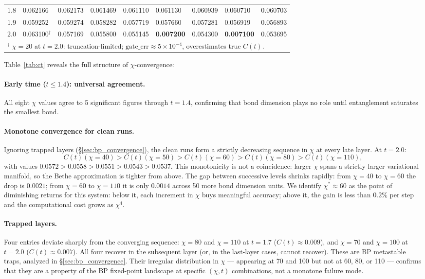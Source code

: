 \documentclass[11pt]{article}
\newcommand{\Ct}{C(t)}
\begin{document}
\begin{table}[ht]
\begin{tabular}{r llllllll}
1.8 & 0.062166 & 0.062173 & 0.061469 & 0.061110 & 0.061130 & 0.060939 & 0.060710 & 0.060703 \\
1.9 & 0.059252 & 0.059274 & 0.058282 & 0.057719 & 0.057660 & 0.057281 & 0.056919 & 0.056893 \\
2.0 & 0.063100$^\dagger$ & 0.057169 & 0.055800 & 0.055145 & \textbf{0.007200} & 0.054300 & \textbf{0.007100} & 0.053695 \\
\midrule
\multicolumn{9}{l}{%
  $^\dagger$ $\chi=20$ at $t=2.0$: truncation-limited; $\mathrm{gate\_err} \approx 5\times10^{-4}$,
  overestimates true $\Ct$.}\\
\bottomrule
\end{tabular}
\end{table}

Table~\ref{tab:ct} reveals the full structure of $\chi$-convergence:

\paragraph{Early time ($t \leq 1.4$): universal agreement.}
All eight $\chi$ values agree to 5 significant figures through $t = 1.4$,
confirming that bond dimension plays no role until entanglement saturates the
smallest bond.

\paragraph{Monotone convergence for clean runs.}
Ignoring trapped layers (§\ref{sec:bp_convergence}), the clean runs form a
strictly decreasing sequence in $\chi$ at every late layer.
At $t=2.0$:
\begin{equation}
  \Ct(\chi=40) > \Ct(\chi=50) > \Ct(\chi=60) > \Ct(\chi=80) > \Ct(\chi=110),
\end{equation}
with values $0.0572 > 0.0558 > 0.0551 > 0.0543 > 0.0537$.
This monotonicity is not a coincidence: larger $\chi$ spans a strictly larger
variational manifold, so the Bethe approximation is tighter from above.
The gap between successive levels shrinks rapidly: from $\chi=40$ to $\chi=60$
the drop is $0.0021$; from $\chi=60$ to $\chi=110$ it is only $0.0014$ across
50 more bond dimension units.
We identify $\chi^* \approx 60$ as the point of diminishing returns for this
system: below it, each increment in $\chi$ buys meaningful accuracy; above it,
the gain is less than $0.2\%$ per step and the computational cost grows as
$\chi^4$.

\paragraph{Trapped layers.}
Four entries deviate sharply from the converging sequence:
$\chi=80$ and $\chi=110$ at $t=1.7$ ($\Ct \approx 0.009$), and
$\chi=70$ and $\chi=100$ at $t=2.0$ ($\Ct \approx 0.007$).
All four recover in the subsequent layer (or, in the last-layer cases, cannot
recover).
These are BP metastable traps, analyzed in §\ref{sec:bp_convergence}.
Their irregular distribution in $\chi$ — appearing at 70 and 100 but not at
60, 80, or 110 — confirms that they are a property of the BP fixed-point
landscape at specific $(\chi, t)$ combinations, not a monotone failure mode.
\end{document}
